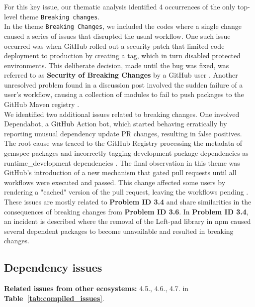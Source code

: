 \documentclass[conference]{IEEEtran}
\begin{document}
	For this key issue, our thematic analysis identified 4 occurrences of the only  top-level theme \texttt{Breaking changes}.\\
In the theme \texttt{Breaking Changes}, we included the codes where a single change caused a series of issues that disrupted the usual workflow. One such issue occurred was when GitHub rolled out a security patch that limited code deployment to production by creating a tag, which in turn disabled protected environments. This deliberate decision, made until the bug was fixed, was referred to as \textbf{Security of Breaking Changes} by a GitHub user \cite{WolfspiritM2024}. Another unresolved problem found in a discussion post involved the sudden failure of a user's workflow, causing a collection of modules to fail to push packages to the GitHub Maven registry \cite{lukas-krecan2024}.\\
	We identified two additional issues related to breaking changes. One involved Dependabot, a GitHub Action bot, which started behaving erratically by reporting unusual dependency update PR changes, resulting in false positives. The root cause was traced to the GitHub Registry processing the metadata of gemspec packages and incorrectly tagging development package dependencies as runtime\_development dependencies \cite{nbibler2024}. The final observation in this theme was GitHub's introduction of a new mechanism that gated pull requests until all workflows were executed and passed. This change affected some users by rendering a "cached" version of the pull request, leaving the workflows pending \cite{tuves2024}.\\
	These issues are mostly related to \textbf{Problem ID 3.4} and share similarities in the consequences of breaking changes from \textbf{Problem ID 3.6}. In \textbf{Problem ID 3.4}, an incident is described where the removal of the Left-pad library in npm caused several dependent packages to become unavailable and resulted in breaking changes.
\subsection*{\textbf{Dependency issues}}
\textbf{Related issues from other ecosystems:} 4.5., 4.6., 4.7. in \textbf{Table~\ref{tab:compiled_issues}}.\\
\end{document}
